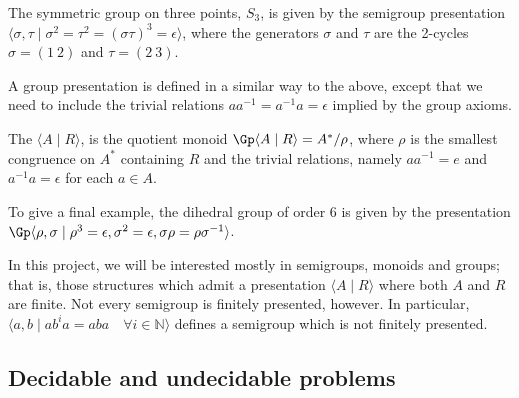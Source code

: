 \documentclass[noindex,noinsetproof,12pt]{lmaths}
\begin{document}
\begin{example}
	The symmetric group on three points, $S_3$, is given by the semigroup presentation $\langle \sigma, \tau \mid \sigma^2 = \tau^2 = (\sigma\tau)^3 = \epsilon \rangle$, where the generators $\sigma$ and $\tau$ are the 2-cycles $\sigma = (1\ 2)$ and $\tau = (2\ 3)$.
\end{example}

A group presentation is defined in a similar way to the above, except that we need to include the trivial relations $aa^{-1} = a^{-1}a = \epsilon$ implied by the group axioms.

\begin{defn}
	The  $\langle A \mid R\rangle$, is the quotient monoid $\Gp \langle A \mid R\rangle = A^*/\rho$, where $\rho$ is the smallest congruence on $A^*$ containing $R$ and the trivial relations, namely $aa^{-1} = e$ and $a^{-1}a = \epsilon$ for each $a \in A$.
\end{defn}

To give a final example, the dihedral group of order 6 is given by the presentation $\Gp \langle \rho, \sigma \mid \rho^3 = \epsilon, \sigma^2 = \epsilon, \sigma\rho = \rho\sigma^{-1} \rangle$.

In this project, we will be interested mostly in  semigroups, monoids and groups; that is, those structures which admit a presentation $\langle A \mid R\rangle$ where both $A$ and $R$ are finite. Not every semigroup is finitely presented, however. In particular, $\langle a, b \mid ab^ia = aba \quad\forall i \in \mathbb{N} \rangle$ defines a semigroup which is not finitely presented.


\subsection{Decidable and undecidable problems}

\end{document}

